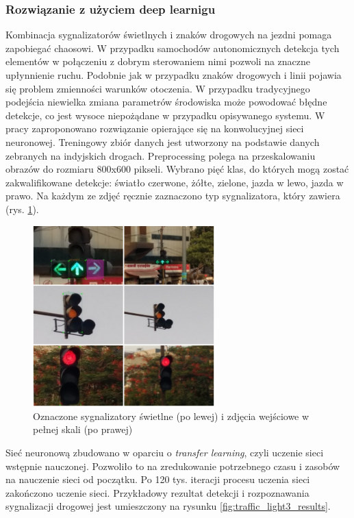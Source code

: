 \subsubsection{Rozwiązanie z użyciem deep learnigu}

Kombinacja sygnalizatorów świetlnych i znaków drogowych na jezdni pomaga zapobiegać chaosowi. W przypadku samochodów autonomicznych detekcja tych elementów w połączeniu z dobrym sterowaniem nimi pozwoli na znaczne upłynnienie ruchu.
Podobnie jak w przypadku znaków drogowych i linii pojawia się problem zmienności warunków otoczenia. 
W przypadku tradycyjnego podejścia niewielka zmiana parametrów środowiska może powodować błędne detekcje, co jest wysoce niepożądane w przypadku opisywanego systemu.
W pracy \cite{T10} zaproponowano rozwiązanie opierające się na konwolucyjnej sieci neuronowej.
Treningowy zbiór danych jest utworzony na podstawie danych zebranych na indyjskich drogach. Preprocessing polega na przeskalowaniu obrazów do rozmiaru 800x600 pikseli. Wybrano pięć klas, do których mogą zostać zakwalifikowane detekcje: światło czerwone, żółte, zielone, jazda w lewo, jazda w prawo. 
Na każdym ze zdjęć ręcznie zaznaczono typ sygnalizatora, który zawiera (rys. \ref{fig:traffic_light3_labels}).

\begin{figure}
  \centering
  \includegraphics[width=7cm]{img/traffic_light3_labels.png}
  \caption{Oznaczone sygnalizatory świetlne (po lewej) i zdjęcia wejściowe w pełnej skali (po prawej)\cite{T10}}
  \label{fig:traffic_light3_labels}
\end{figure}

Sieć neuronową zbudowano w oparciu o \textit{transfer learning}, czyli uczenie sieci wstępnie nauczonej. Pozwoliło to na zredukowanie potrzebnego czasu i zasobów na nauczenie sieci od początku. 
Po 120 tys. iteracji procesu uczenia sieci zakończono uczenie sieci. Przykładowy rezultat detekcji i rozpoznawania sygnalizacji drogowej jest umieszczony na rysunku \ref{fig:traffic_light3_results}.

